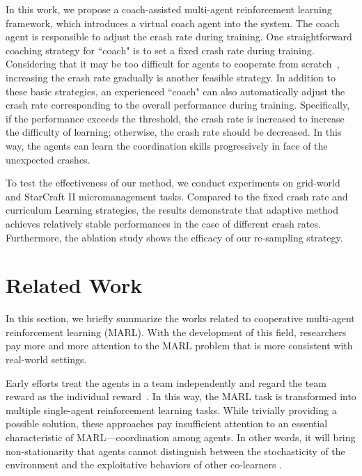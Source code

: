 \documentclass{article}
\begin{document}
In this work, we propose a coach-assisted multi-agent reinforcement learning framework, which introduces a virtual coach agent into the system.
The coach agent is responsible to adjust the crash rate during training.
One straightforward coaching strategy for ``coach" is to set a fixed crash rate during training.
Considering that it may be too difficult for agents to cooperate from scratch~\cite{narvekar2020curriculum}, increasing the crash rate gradually is another feasible strategy.
In addition to these basic strategies, an experienced ``coach" can also automatically adjust the crash rate corresponding to the overall performance during training.
Specifically, if the performance exceeds the threshold, the crash rate is increased to increase the difficulty of learning; otherwise, the crash rate should be decreased.
In this way, the agents can learn the coordination skills progressively in face of the unexpected crashes.

To test the effectiveness of our method, we conduct experiments on grid-world and StarCraft II micromanagement tasks.
Compared to the fixed crash rate and curriculum Learning strategies, the results demonstrate that adaptive method achieves relatively stable performances in the case of different crash rates.
Furthermore, the ablation study shows the efficacy of our re-sampling strategy.


\section{Related Work}
In this section, we briefly summarize the works related to cooperative multi-agent reinforcement learning (MARL).
With the development of this field, researchers pay more and more attention to the MARL problem that is more consistent with real-world settings.

Early efforts treat the agents in a team independently and regard the team reward as the individual reward~\cite{tan1993multi,mnih2015human,omidshafiei2017deep,foerster2017stabilising}.
In this way, the MARL task is transformed into multiple single-agent reinforcement learning tasks.
While trivially providing a possible solution, these approaches pay insufficient attention to an essential characteristic of MARL---coordination among agents. In other words, it will bring non-stationarity that agents cannot distinguish between the stochasticity of the environment and the exploitative behaviors of other co-learners \cite{lowe2017multi}.
\end{document}
